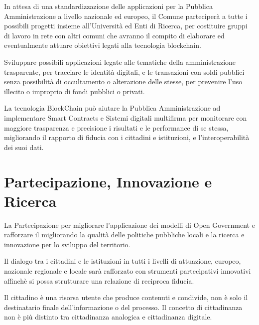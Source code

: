 \documentclass[a4paper,14pt,italian]{sphinxmanual}
\begin{document}
In attesa di una standardizzazione delle applicazioni  per la Pubblica Amministrazione a livello nazionale ed europeo, il Comune parteciperà a tutte i possibili progetti insieme all’Università ed Enti di Ricerca, per costituire gruppi di lavoro in rete con altri comuni che avranno il compito di elaborare ed eventualmente attuare obiettivi legati alla tecnologia blockchain.

Sviluppare possibili applicazioni legate alle tematiche della amministrazione trasparente, per tracciare le identità digitali, e le transazioni con soldi pubblici senza possibilità di occultamento o alterazione delle stesse, per prevenire l’uso illecito o improprio di fondi pubblici o privati.

La tecnologia BlockChain può aiutare la Pubblica Amministrazione ad implementare Smart Contracts e Sistemi digitali multifirma per monitorare con maggiore trasparenza e precisione i risultati e le performance di se stessa, migliorando il rapporto di fiducia con i cittadini e istituzioni, e l’interoperabilità dei suoi dati.


\chapter{Partecipazione, Innovazione e Ricerca}
\label{\detokenize{partecipazione:partecipazione-innovazione-e-ricerca}}\label{\detokenize{partecipazione::doc}}


La Partecipazione per migliorare l’applicazione dei modelli di Open Government e rafforzare il  migliorando la qualità delle politiche pubbliche locali e la ricerca e innovazione per lo sviluppo del territorio.

Il dialogo tra i cittadini e le istituzioni in tutti i livelli di attuazione, europeo, nazionale regionale e locale sarà rafforzato con strumenti partecipativi innovativi affinchè si possa strutturare una relazione di reciproca fiducia.

Il cittadino è una risorsa utente che produce contenuti e condivide, non è solo il destinatario finale dell’informazione o del processo.
Il concetto di cittadinanza non è più distinto tra cittadinanza analogica e cittadinanza digitale.
\end{document}

